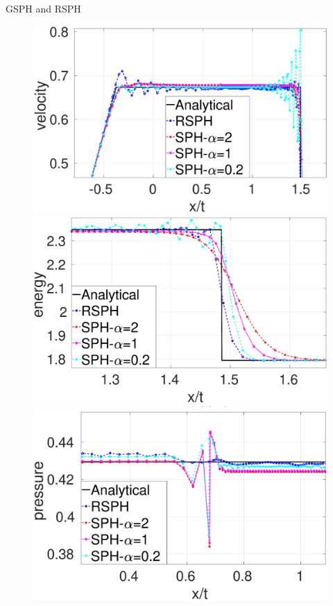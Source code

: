 \documentclass{beamer}
\begin{document}
\begin{frame}{GSPH and RSPH}
\begin{figure}[t]
    \centering
    \begin{minipage}{.33 \textwidth}
        \centering
        \includegraphics[width=0.99 \textwidth]{./Chapter-4/Figures/Sod/RCM-Sod-SPH-alf-v-zoom}
    \end{minipage}%
    \begin{minipage}{.33 \textwidth}
        \centering
        \includegraphics[width=0.99 \textwidth]{./Chapter-4/Figures/Sod/RCM-Sod-SPH-alf-e-zoom}
    \end{minipage}%
    \begin{minipage}{.33\textwidth}
        \centering
        \includegraphics[width=0.99 \textwidth]{./Chapter-4/Figures/Sod/RCM-Sod-SPH-alf-p-zoom}

\end{minipage}
\end{figure}
\end{frame}
\end{document}
